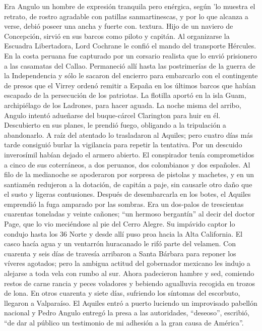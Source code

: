 \documentclass[10pt,twoside,openright]{memoir}
\begin{document}
Era Angulo un hombre de expresión tranquila pero enérgica, según 'lo
muestra el retrato, de rostro agradable con patillas sanmartinescas, y
por lo que alcanza a verse, debió poseer una ancha y fuerte con.
textura. Hijo de un naviero de Concepción, sirvió en sus barcos como
piloto y capitán. Al organizarse la Escuadra Libertadora, Lord Cochrane
le confió el mando del transporte Hércules. En la costa peruana fue
capturado por un corsario realista que lo envió prisionero a las
casamatas del Callao. Permaneció allí hasta las postrimerías de la
guerra de la Independencia y sólo le sacaron del encierro para
embarcarlo con el contingente de presos que el Virrey ordenó remitir a
España en los últimos barcos que habían escapado de la persecución de
los patriotas. La flotilla aportó en la isla Guam, archipiélago de los
Ladrones, para hacer aguada. La noche misma del arribo, Angulo intentó
adueñarse del buque-cárcel Clarington para huir en él. Descubierto en
sus planes, le prendió fuego, obligando a la tripulación a abandonarlo.
A raíz del atentado lo trasladaron al Aquiles; pero cuatro días más
tarde consiguió burlar la vigilancia para repetir la tentativa. Por un
descuido inverosímil habían dejado el armero abierto. El conspirador
tenía comprometidos a cinco de sus coterráneos, a dos peruanos, dos
colombianos y dos españoles. Al filo de la medianoche se apoderaron por
sorpresa de pistolas y machetes, y en un santiamén redujeron a la
dotación, de capitán a paje, sin causarle otro daño que el susto y
ligeras contusiones. Después de desembarcarla en los botes, el Aquiles
emprendió la fuga amparado por las sombras. Era un dos-palos de
trescientas cuarentas toneladas y veinte cañones; ``un hermoso bergantín''
al decir del doctor Page, que lo vio meciéndose al pie del Cerro Alegre.
Su impávido captor lo condujo hasta los 36 Norte y desde allí puso proa
hacia la Alta California. El casco hacía agua y un ventarrón huracanado
le rifó parte del velamen. Con cuarenta y seis días de travesía
arribaron a Santa Bárbara para reponer los víveres agotados; pero la
ambigua actitud del gobernador mexicano les indujo a alejarse a toda
vela con rumbo al sur. Ahora padecieron hambre y sed, comiendo restos de
carne rancia y peces voladores y bebiendo agualluvia recogida en trozos
de lona. En otros cuarenta y siete días, sufriendo los síntomas del
escorbuto, llegaron a Valparaíso. El Aquiles entró a puerto luciendo un
improvisado pabellón nacional y Pedro Angulo entregó la presa a las
autoridades, ``deseoso'', escribió, ``de dar al público un testimonio de mi
adhesión a la gran causa de América''.
\end{document}
